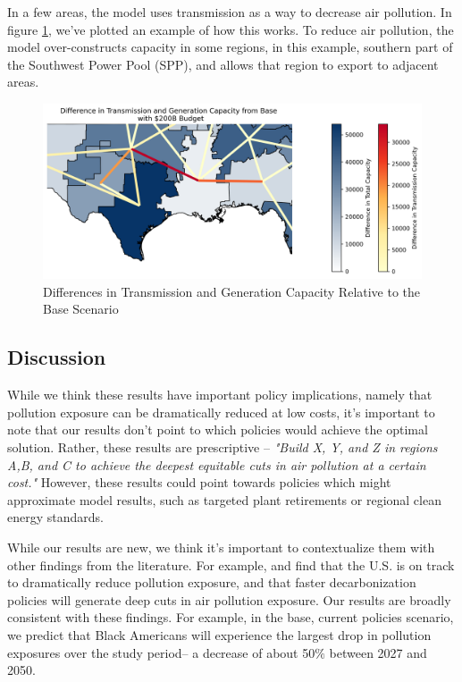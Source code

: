 \documentclass[a4paper]{article}
\theoremstyle{definition}
\theoremstyle{plain}
\begin{document}
In a few areas, the model uses transmission as a way to decrease air pollution. In figure \ref{transmissionsubstitution}, we've plotted an example of how this works. To reduce air pollution, the model over-constructs capacity in some regions, in this example, southern part of the Southwest Power Pool (SPP), and allows that region to export to adjacent areas.

\begin{figure}
    \centering
    \includegraphics[width=0.9\linewidth]{Figures/EndogenousPaper/transmission_capacity_substitution.png}
    \caption{Differences in Transmission and Generation Capacity Relative to the Base Scenario}
    \label{transmissionsubstitution}
\end{figure}

\subsection{Discussion}
While we think these results have important policy implications, namely that pollution exposure can be dramatically reduced at low costs, it's important to note that our results don't point to which policies would achieve the optimal solution. Rather, these results are prescriptive -- \textit{"Build X, Y, and Z in regions A,B, and C to achieve the deepest equitable cuts in air pollution at a certain cost."} However, these results could point towards policies which might approximate model results, such as targeted plant retirements or regional clean energy standards.

While our results are new, we think it's important to contextualize them with other findings from the literature. For example, \citet{Shawhan2024PoliciesAmericans} and \citet{Goforth2022AirStrategies} find that the U.S. is on track to dramatically reduce pollution exposure, and that faster decarbonization policies will generate deep cuts in air pollution exposure. Our results are broadly consistent with these findings. For example, in the base, current policies scenario, we predict that Black Americans will experience the largest drop in pollution exposures over the study period-- a decrease of about 50$\%$ between 2027 and 2050.
\end{document}
